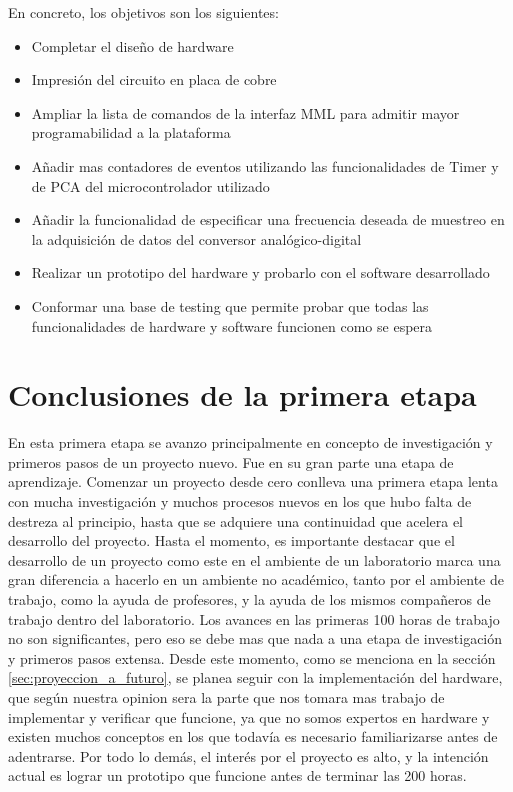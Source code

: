 \documentclass{article}
\theoremstyle{definition}
\theoremstyle{remark}
\begin{document}
En concreto, los objetivos son los siguientes:
\begin{itemize}
	\item Completar el diseño de hardware
	\item Impresión del circuito en placa de cobre
	\item Ampliar la lista de comandos de la interfaz MML para admitir mayor programabilidad a la plataforma
	\item Añadir mas contadores de eventos utilizando las funcionalidades de Timer y de PCA del microcontrolador utilizado
	\item Añadir la funcionalidad de especificar una frecuencia deseada de muestreo en la adquisición de datos del conversor analógico-digital
	\item Realizar un prototipo del hardware y probarlo con el software desarrollado
	\item Conformar una base de testing que permite probar que todas las funcionalidades de hardware y software funcionen como se espera
\end{itemize}



\section{Conclusiones de la primera etapa} %
\label{sec:conslusiones_de_la_primera_etapa}

En esta primera etapa se avanzo principalmente en concepto de investigación y primeros pasos de un proyecto nuevo. Fue en su gran parte una etapa de aprendizaje. Comenzar un proyecto desde cero conlleva una primera etapa lenta con mucha investigación y muchos procesos nuevos en los que hubo falta de destreza al principio, hasta que se adquiere una continuidad que acelera el desarrollo del proyecto. Hasta el momento, es importante destacar que el desarrollo de un proyecto como este en el ambiente de un laboratorio marca una gran diferencia a hacerlo en un ambiente no académico, tanto por el ambiente de trabajo, como la ayuda de profesores, y la ayuda de los mismos compañeros de trabajo dentro del laboratorio. Los avances en las primeras 100 horas de trabajo no son significantes, pero eso se debe mas que nada a una etapa de investigación y primeros pasos extensa. Desde este momento, como se menciona en la sección \ref{sec:proyeccion_a_futuro}, se planea seguir con la implementación del hardware, que según nuestra opinion sera la parte que nos tomara mas trabajo de implementar y verificar que funcione, ya que no somos expertos en hardware y existen muchos conceptos en los que todavía es necesario familiarizarse antes de adentrarse. Por todo lo demás, el interés por el proyecto es alto, y la intención actual es lograr un prototipo que funcione antes de terminar las 200 horas.
\end{document}
